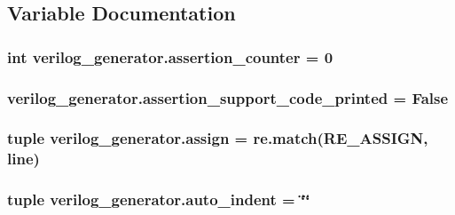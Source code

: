 \subsection{Variable Documentation}
\hypertarget{namespaceverilog__generator_a240aab9d20a84388dc27eb1f446b0767}{
\subsubsection[{assertion\-\_\-counter}]{\setlength{\rightskip}{0pt plus 5cm}int verilog\-\_\-generator.\-assertion\-\_\-counter = 0}}\label{namespaceverilog__generator_a240aab9d20a84388dc27eb1f446b0767}
\hypertarget{namespaceverilog__generator_a0b5af5f0a450d4472bada6b8dc7f1476}{
\subsubsection[{assertion\-\_\-support\-\_\-code\-\_\-printed}]{\setlength{\rightskip}{0pt plus 5cm}verilog\-\_\-generator.\-assertion\-\_\-support\-\_\-code\-\_\-printed = False}}\label{namespaceverilog__generator_a0b5af5f0a450d4472bada6b8dc7f1476}
\hypertarget{namespaceverilog__generator_aca014ca977d2ad248a4281f819d4204a}{
\subsubsection[{assign}]{\setlength{\rightskip}{0pt plus 5cm}tuple verilog\-\_\-generator.\-assign = re.\-match({\bf R\-E\-\_\-\-A\-S\-S\-I\-G\-N}, line)}}\label{namespaceverilog__generator_aca014ca977d2ad248a4281f819d4204a}
\hypertarget{namespaceverilog__generator_a6dc0cb849be3aeecb483610528ce0a8c}{
\subsubsection[{auto\-\_\-indent}]{\setlength{\rightskip}{0pt plus 5cm}tuple verilog\-\_\-generator.\-auto\-\_\-indent = \char`\"{}\char`\"{}}}\label{namespaceverilog__generator_a6dc0cb849be3aeecb483610528ce0a8c}
